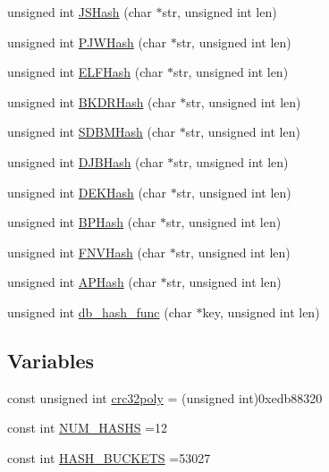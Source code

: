 \begin{DoxyCompactItemize}
\item 
unsigned int \mbox{\hyperlink{namespaceFILEDB_a3533131675008d2c3b9b3d1685b2e679}{J\+S\+Hash}} (char $\ast$str, unsigned int len)
\item 
unsigned int \mbox{\hyperlink{namespaceFILEDB_ab2508d2100ad31133a86ce47aada4241}{P\+J\+W\+Hash}} (char $\ast$str, unsigned int len)
\item 
unsigned int \mbox{\hyperlink{namespaceFILEDB_ad02d1b620691350d964deb5beab272eb}{E\+L\+F\+Hash}} (char $\ast$str, unsigned int len)
\item 
unsigned int \mbox{\hyperlink{namespaceFILEDB_a06c984d24be338a8cfa3fcd1296914aa}{B\+K\+D\+R\+Hash}} (char $\ast$str, unsigned int len)
\item 
unsigned int \mbox{\hyperlink{namespaceFILEDB_a93a0c708c1ad9c299200dbaa873c5531}{S\+D\+B\+M\+Hash}} (char $\ast$str, unsigned int len)
\item 
unsigned int \mbox{\hyperlink{namespaceFILEDB_a7d5f1ce86b07fb3c5ec314fab9bd5e30}{D\+J\+B\+Hash}} (char $\ast$str, unsigned int len)
\item 
unsigned int \mbox{\hyperlink{namespaceFILEDB_ab2561866ca3a62230f86ec7860fec260}{D\+E\+K\+Hash}} (char $\ast$str, unsigned int len)
\item 
unsigned int \mbox{\hyperlink{namespaceFILEDB_a81bebe16f4e0ccc238b04621af6ada41}{B\+P\+Hash}} (char $\ast$str, unsigned int len)
\item 
unsigned int \mbox{\hyperlink{namespaceFILEDB_ab7ad322a4b472713751d23b4b6495ddf}{F\+N\+V\+Hash}} (char $\ast$str, unsigned int len)
\item 
unsigned int \mbox{\hyperlink{namespaceFILEDB_a23c71972866e86f222ad440284380f45}{A\+P\+Hash}} (char $\ast$str, unsigned int len)
\item 
unsigned int \mbox{\hyperlink{namespaceFILEDB_a506040cd2b9f1527e415461aac226fb5}{db\+\_\+hash\+\_\+func}} (char $\ast$key, unsigned int len)
\end{DoxyCompactItemize}
\subsection*{Variables}
\begin{DoxyCompactItemize}
\item 
const unsigned int \mbox{\hyperlink{namespaceFILEDB_a8a86234763af41b14f1cfcf436e8674f}{crc32poly}} = (unsigned int)0xedb88320
\item 
const int \mbox{\hyperlink{namespaceFILEDB_ae46b35f4ae3d23ec8b3470306fef8ab5}{N\+U\+M\+\_\+\+H\+A\+S\+HS}} =12
\item 
const int \mbox{\hyperlink{namespaceFILEDB_a791b55170820bb840d3e7d583f363415}{H\+A\+S\+H\+\_\+\+B\+U\+C\+K\+E\+TS}} =53027
\end{DoxyCompactItemize}


